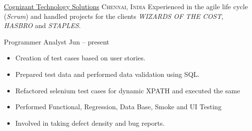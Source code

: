 
\headedsection  %
  {\href{https://www.cognizant.com}{Cognizant Technology Solutions}}
  {\textsc{Chennai, India}} 
  {\newline{}Experienced in the agile life cycle (\emph{Scrum}) and handled projects for the clients  \emph{WIZARDS OF THE COST}, \emph{HASBRO} and \emph{STAPLES}.
} 
  {%
  \headedsubsection
    {Programmer Analyst}
    {Jun  -- present}
    {\begin{itemize}
        \item Creation of test cases based on user stories. 
        \item Prepared test data and performed data validation using SQL.
        \item Refactored selenium test cases for dynamic XPATH and executed the same
        \item Performed Functional, Regression, Data Base, Smoke and UI Testing
        \item Involved in taking defect density and bug reports. 
    \end{itemize}
    }
}
